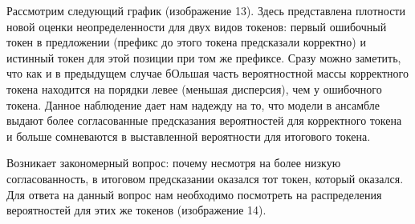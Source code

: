 \documentclass[a4paper,14pt]{extarticle}
\begin{document}
	\begin{figure}[t]
	\end{figure}
	Рассмотрим следующий график (изображение 13). Здесь представлена плотности новой оценки неопределенности для двух видов токенов: первый ошибочный токен в предложении (префикс до этого токена предсказали корректно) и истинный токен для этой позиции при том же префиксе. Сразу можно заметить, что как и в предыдущем случае бОльшая часть вероятностной массы корректного токена находится на порядки левее (меньшая дисперсия), чем у ошибочного токена. Данное наблюдение дает нам надежду на то, что модели в ансамбле выдают более согласованные предсказания вероятностей для корректного токена и больше сомневаются в выставленной вероятности для итогового токена.
	
	Возникает закономерный вопрос: почему несмотря на более низкую согласованность, в итоговом предсказании оказался тот токен, который оказался. Для ответа на данный вопрос нам необходимо посмотреть на распределения вероятностей для этих же токенов (изображение 14).
	
	\begin{figure}[t]
	\end{figure}
	
\end{document}
